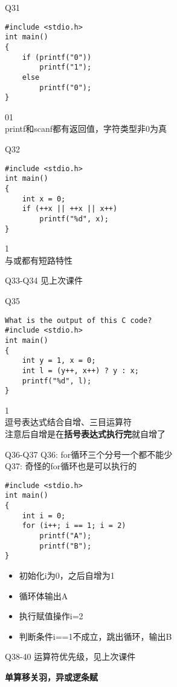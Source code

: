 \documentclass[UTF8]{ctexbeamer}
\begin{document}
\begin{frame}[fragile]{Q31}
\begin{lstlisting}
#include <stdio.h>
int main()
{
    if (printf("0"))
        printf("1");
    else
    	printf("0");
}
\end{lstlisting}
01\\
printf和scanf都有返回值，字符类型非0为真
\end{frame}

\begin{frame}[fragile]{Q32}
\begin{lstlisting}
#include <stdio.h>
int main()
{
    int x = 0;
    if (++x || ++x || x++)
        printf("%d", x);
}
\end{lstlisting}
1\\
与或都有短路特性
\end{frame}

\begin{frame}{Q33-Q34}
见上次课件
\end{frame}

\begin{frame}[fragile]{Q35}
\begin{lstlisting}
What is the output of this C code?
#include <stdio.h>
int main()
{
    int y = 1, x = 0;
    int l = (y++, x++) ? y : x;
    printf("%d", l);
}
\end{lstlisting}
1\\
逗号表达式结合自增、三目运算符\\
注意后自增是在\textbf{括号表达式执行完}就自增了
\end{frame}

\begin{frame}[fragile]{Q36-Q37}
Q36: for循环三个分号一个都不能少\\
Q37: 奇怪的for循环也是可以执行的
\begin{lstlisting}
#include <stdio.h>
int main()
{
    int i = 0;
    for (i++; i == 1; i = 2)
        printf("A");
        printf("B");
}
\end{lstlisting}
\begin{itemize}
	\item 初始化i为0，之后自增为1
	\item 循环体输出A
	\item 执行赋值操作i=2
	\item 判断条件i==1不成立，跳出循环，输出B
\end{itemize}
\end{frame}

\begin{frame}{Q38-40}
运算符优先级，见上次课件\\
\begin{center}
\Large\textbf{单算移关羽，异或逻条赋}
\end{center}
\end{frame}
\end{document}

